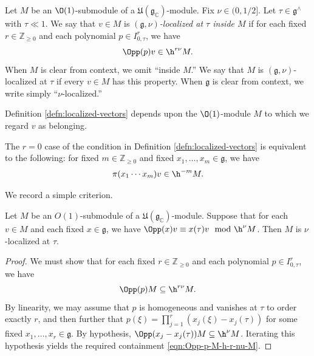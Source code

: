 \begin{definition}\label{defn:localized-vectors}
  Let $M$ be an $\O(1)$-submodule of a $\mathfrak{U}(\mathfrak{g}_\mathbb{C})$-module.  Fix $\nu \in (0,1/2]$.  Let $\tau \in \mathfrak{g}^\wedge$ with $\tau \ll 1$.  We say that $v \in M$ is \emph{$(\mathfrak{g},\nu)$-localized at $\tau$ inside $M$} if for each fixed $r \in \mathbb{Z}_{\geq 0}$ and each polynomial $p \in I_{0,\tau}^r$, we have
  \[
    \Opp(p) v \in \h^{r \nu} M.
  \]
  When $M$ is clear from context, we omit ``inside $M$.''  We say that $M$ is $(\mathfrak{g},\nu)$-localized at $\tau$ if every $v \in M$ has this property.  When $\mathfrak{g}$ is clear from context, we write simply ``$\nu$-localized.''
\end{definition}
\begin{remark}
  Definition \ref{defn:localized-vectors} depends upon the $\O(1)$-module $M$ to which we regard $v$ as belonging.
\end{remark}
\begin{remark}\label{rmk:r-=-0}
  The $r = 0$ case of the condition in Definition \ref{defn:localized-vectors} is equivalent to the following: for fixed $m \in \mathbb{Z}_{\geq 0}$ and fixed $x_1,\dotsc,x_m \in \mathfrak{g}$, we have
  \begin{equation*}
    \pi(x_1 \dotsb x_m) v \in \h^{-m} M.
  \end{equation*}
\end{remark}

We record a simple criterion.
\begin{lemma}\label{lem:localization-criterion-degree-1}
  Let $M$ be an $O(1)$-submodule of a $\mathfrak{U}(\mathfrak{g}_\mathbb{C})$-module.  Suppose that for each $v \in M$ and each fixed $x \in \mathfrak{g}$, we have $\Opp(x) v \equiv x(\tau) v \mod{\h^\nu M}$.  Then $M$ is $\nu$-localized at $\tau$.
\end{lemma}
\begin{proof}
  We must show that for each fixed $r \in \mathbb{Z}_{\geq 0}$ and each polynomial $p \in I^r_{0,\tau}$, we have
  \begin{equation}\label{eqn:Opp-p-M-h-r-nu-M}
    \Opp(p) M \subseteq  \h^{r \nu} M.
  \end{equation}
  By linearity, we may assume that $p$ is homogeneous and vanishes at $\tau$ to order exactly $r$, and then further that $p(\xi) = \prod_{j=1}^r (x_j(\xi) - x_j(\tau))$ for some fixed $x_1,\dotsc,x_r \in \mathfrak{g}$.  By hypothesis, $\Opp(x_j - x_j(\tau)) M \subseteq \h^{\nu} M$.  Iterating this hypothesis yields the required containment \eqref{eqn:Opp-p-M-h-r-nu-M}.
\end{proof}

